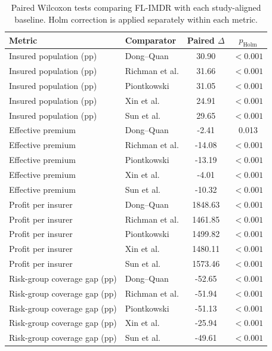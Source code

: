 \begin{table}[t]
\centering
\caption{Paired Wilcoxon tests comparing FL-IMDR with each study-aligned baseline. Holm correction is applied separately within each metric.}
\label{tab:external_significance}
\footnotesize
\begin{tabular}{llcc}
\toprule
Metric & Comparator & Paired $\Delta$ & $p_{\mathrm{Holm}}$ \\
\midrule
Insured population (pp) & Dong–Quan & 30.90 & $<0.001$ \\
Insured population (pp) & Richman et al. & 31.66 & $<0.001$ \\
Insured population (pp) & Piontkowski & 31.05 & $<0.001$ \\
Insured population (pp) & Xin et al. & 24.91 & $<0.001$ \\
Insured population (pp) & Sun et al. & 29.65 & $<0.001$ \\
Effective premium & Dong–Quan & -2.41 & 0.013 \\
Effective premium & Richman et al. & -14.08 & $<0.001$ \\
Effective premium & Piontkowski & -13.19 & $<0.001$ \\
Effective premium & Xin et al. & -4.01 & $<0.001$ \\
Effective premium & Sun et al. & -10.32 & $<0.001$ \\
Profit per insurer & Dong–Quan & 1848.63 & $<0.001$ \\
Profit per insurer & Richman et al. & 1461.85 & $<0.001$ \\
Profit per insurer & Piontkowski & 1499.82 & $<0.001$ \\
Profit per insurer & Xin et al. & 1480.11 & $<0.001$ \\
Profit per insurer & Sun et al. & 1573.46 & $<0.001$ \\
Risk-group coverage gap (pp) & Dong–Quan & -52.65 & $<0.001$ \\
Risk-group coverage gap (pp) & Richman et al. & -51.94 & $<0.001$ \\
Risk-group coverage gap (pp) & Piontkowski & -51.13 & $<0.001$ \\
Risk-group coverage gap (pp) & Xin et al. & -25.94 & $<0.001$ \\
Risk-group coverage gap (pp) & Sun et al. & -49.61 & $<0.001$ \\
\bottomrule
\end{tabular}
\end{table}
